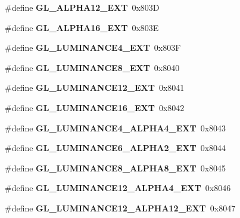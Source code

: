 \begin{DoxyCompactItemize}
\item 
\#define {\bfseries G\+L\+\_\+\+A\+L\+P\+H\+A12\+\_\+\+E\+X\+T}~0x803\+D\label{_s_d_l__opengl_8h_a28b78537c062e5bcdf4dfe1bde50b4c6}

\item 
\#define {\bfseries G\+L\+\_\+\+A\+L\+P\+H\+A16\+\_\+\+E\+X\+T}~0x803\+E\label{_s_d_l__opengl_8h_a8c834fe9978d3ae5b8be3034bd16af2f}

\item 
\#define {\bfseries G\+L\+\_\+\+L\+U\+M\+I\+N\+A\+N\+C\+E4\+\_\+\+E\+X\+T}~0x803\+F\label{_s_d_l__opengl_8h_a314dfef7d03af2395ec8053558ba41f0}

\item 
\#define {\bfseries G\+L\+\_\+\+L\+U\+M\+I\+N\+A\+N\+C\+E8\+\_\+\+E\+X\+T}~0x8040\label{_s_d_l__opengl_8h_a23492b23d502f866c1a13cba9ed7e5c2}

\item 
\#define {\bfseries G\+L\+\_\+\+L\+U\+M\+I\+N\+A\+N\+C\+E12\+\_\+\+E\+X\+T}~0x8041\label{_s_d_l__opengl_8h_ac70ed4ed31687cab8164911fb4906ebe}

\item 
\#define {\bfseries G\+L\+\_\+\+L\+U\+M\+I\+N\+A\+N\+C\+E16\+\_\+\+E\+X\+T}~0x8042\label{_s_d_l__opengl_8h_ae8e15458f9517faac4b59f8dcbf81724}

\item 
\#define {\bfseries G\+L\+\_\+\+L\+U\+M\+I\+N\+A\+N\+C\+E4\+\_\+\+A\+L\+P\+H\+A4\+\_\+\+E\+X\+T}~0x8043\label{_s_d_l__opengl_8h_a7a77f6f56910d4a05b8f2a4974c453d7}

\item 
\#define {\bfseries G\+L\+\_\+\+L\+U\+M\+I\+N\+A\+N\+C\+E6\+\_\+\+A\+L\+P\+H\+A2\+\_\+\+E\+X\+T}~0x8044\label{_s_d_l__opengl_8h_a2e37359b96570765f1cc77158f11fd4c}

\item 
\#define {\bfseries G\+L\+\_\+\+L\+U\+M\+I\+N\+A\+N\+C\+E8\+\_\+\+A\+L\+P\+H\+A8\+\_\+\+E\+X\+T}~0x8045\label{_s_d_l__opengl_8h_acff22a34c242014d75eebaa8ca8653e4}

\item 
\#define {\bfseries G\+L\+\_\+\+L\+U\+M\+I\+N\+A\+N\+C\+E12\+\_\+\+A\+L\+P\+H\+A4\+\_\+\+E\+X\+T}~0x8046\label{_s_d_l__opengl_8h_ac13c3946b177ea60013ab9f6aba5c4f3}

\item 
\#define {\bfseries G\+L\+\_\+\+L\+U\+M\+I\+N\+A\+N\+C\+E12\+\_\+\+A\+L\+P\+H\+A12\+\_\+\+E\+X\+T}~0x8047\label{_s_d_l__opengl_8h_a5dad1451379dbd5a3202bbb846298ae6}


\end{DoxyCompactItemize}
